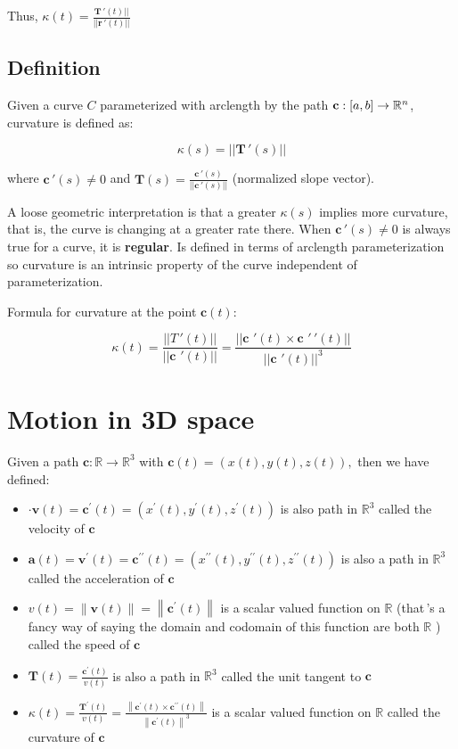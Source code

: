 Thus, $\boxed{\kappa(t)=\frac{\textbf{T}\,'(t)||}{||\textbf{r}\,'(t)||}}$

\subsection{Definition}

Given a curve $C$ parameterized with arclength by the path $\textbf{c}:[a,b]\rightarrow \mathbb{R}^n$,
curvature is defined as:

\[\boxed{\kappa(s)=||\textbf{T}\,'(s)||}\]

where $\textbf{c}\,'(s)\neq 0$ and $\textbf{T}(s)=\frac{\textbf{c}\,'(s)}{||\textbf{c}\,'(s)||}$ (normalized slope vector).\newline

A loose geometric interpretation is that a greater $\kappa(s)$ implies
more curvature, that is, the curve is changing at a greater rate there.
When $\textbf{c}\,'(s)\neq 0$ is always true for a curve, it is \textbf{regular}.
Is defined in terms of arclength parameterization so curvature
is an intrinsic property of the curve independent of parameterization.\newline

\noindent
Formula for curvature at the point $\textbf{c}(t)$:

\[\boxed{\kappa(t)=\frac{||T\,'(t)||}{||\textbf{c}\,\,'(t)||}=\frac{||\textbf{c}\,\,'(t)\times \textbf{c}\,\,'\,'(t)||}{||\textbf{c}\,\,'(t)||^3}}\]

\section{Motion in 3D space}

Given a path $\textbf{c}: \mathbb{R} \rightarrow \mathbb{R}^{3}$ with $\textbf{c}(t)=(x(t), y(t), z(t)),$ then we have defined:
\begin{itemize}
    \item $\cdot \textbf{v}(t)=\textbf{c}^{\prime}(t)=\left(x^{\prime}(t), y^{\prime}(t), z^{\prime}(t)\right)$ is also path in $\mathbb{R}^{3}$ called the velocity of $\textbf{c}$
    \item $\textbf{a}(t)=\textbf{v}^{\prime}(t)=\textbf{c}^{\prime \prime}(t)=\left(x^{\prime \prime}(t), y^{\prime \prime}(t), z^{\prime \prime}(t)\right)$ is also a path in $\mathbb{R}^{3}$ called the acceleration of $\textbf{c}$
    \item $v(t)=\|\textbf{v}(t)\|=\left\|\textbf{c}^{\prime}(t)\right\|$ is a scalar valued function on $\mathbb{R}$ (that\,'s a fancy way of saying the domain and codomain of this function are both $\mathbb{R}$ ) called the speed of $\textbf{c}$
    \item $\textbf{T}(t)=\frac{\textbf{c}^{\prime}(t)}{v(t)}$ is also a path in $\mathbb{R}^{3}$ called the unit tangent to $\textbf{c}$
    \item $\kappa(t)=\frac{\textbf{T}^{\prime}(t)}{v(t)}=\frac{\left\|\textbf{c}^{\prime}(t) \times \textbf{c}^{\prime \prime}(t)\right\|}{\left\|\textbf{c}^{\prime}(t)\right\|^{3}}$ is a scalar valued function on $\mathbb{R}$ called the curvature of $\textbf{c}$
\end{itemize}

